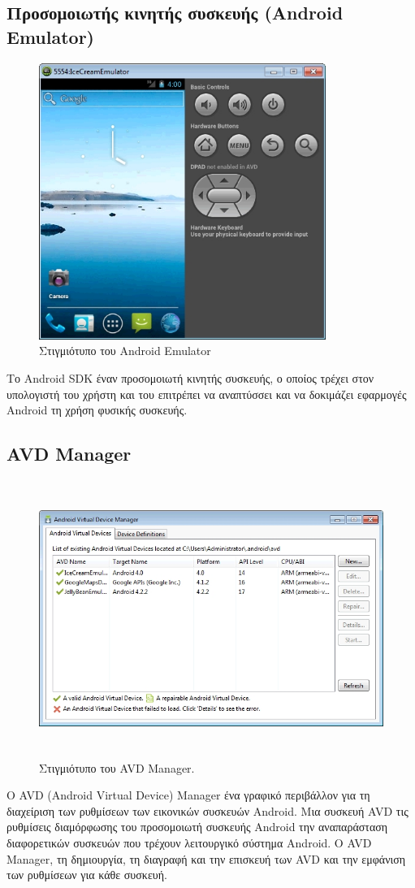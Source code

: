 \documentclass[12pt,twoside,openright]{report}
\begin{document}
\subsection{Προσομοιωτής κινητής συσκευής \lt (Android Emulator)\gt}
\begin{figure}[H]
\centering
\includegraphics[height=9cm]{images/emulator}
\caption{Στιγμιότυπο του \lt Android Emulator\gt}
\label{fig:emulator}
\end{figure}
Το \lt Android SDK  έναν προσομοιωτή κινητής συσκευής, ο οποίος τρέχει στον υπολογιστή του χρήστη και του επιτρέπει να αναπτύσσει και να δοκιμάζει εφαρμογές \lt Android  τη χρήση φυσικής συσκευής.
\subsection{\lt AVD Manager\gt}
\begin{figure}[H]
\centering
\includegraphics[height=9cm]{images/avd_manager}
\caption{Στιγμιότυπο του \lt AVD Manager.\gt}
\label{fig:AVDmanager}
\end{figure}
Ο \lt AVD (Android Virtual Device) Manager  ένα γραφικό περιβάλλον για τη διαχείριση των ρυθμίσεων των εικονικών συσκευών \lt Android\gt. Μια συσκευή 
\lt AVD  τις ρυθμίσεις διαμόρφωσης του προσομοιωτή συσκευής \lt Android  την αναπαράσταση διαφορετικών συσκευών που τρέχουν λειτουργικό σύστημα \lt Android\gt. Ο \lt AVD Manager,  τη δημιουργία, τη διαγραφή και την επισκευή των \lt AVD  και την εμφάνιση των ρυθμίσεων για κάθε συσκευή.
\end{document}
